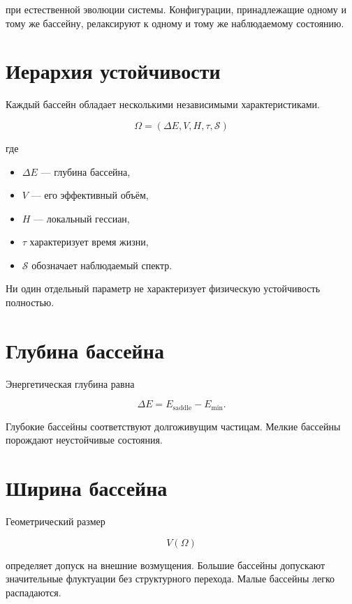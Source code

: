 при естественной эволюции системы. Конфигурации, принадлежащие одному и тому же бассейну, релаксируют к одному и тому же наблюдаемому состоянию.

\section{Иерархия устойчивости}

Каждый бассейн обладает несколькими независимыми характеристиками.

\[ \Omega = (\Delta E, V, H, \tau, \mathcal S) \]

где

\begin{itemize}
\item $\Delta E$ — глубина бассейна,

\item $V$ — его эффективный объём,

\item $H$ — локальный гессиан,

\item $\tau$ характеризует время жизни,

\item $\mathcal S$ обозначает наблюдаемый спектр.

\end{itemize}

Ни один отдельный параметр не характеризует физическую устойчивость полностью.

\section{Глубина бассейна}

Энергетическая глубина равна

\[ \Delta E = E_{\mathrm{saddle}} - E_{\min}. \]

Глубокие бассейны соответствуют долгоживущим частицам. Мелкие бассейны порождают неустойчивые состояния.

\section{Ширина бассейна}

Геометрический размер

\[ V(\Omega) \]

определяет допуск на внешние возмущения. Большие бассейны допускают значительные флуктуации без структурного перехода. Малые бассейны легко распадаются.

